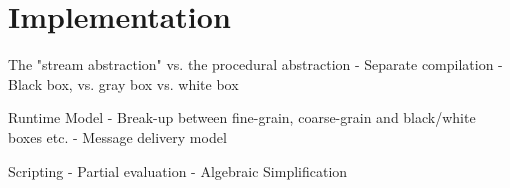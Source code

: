 \section{Implementation}

The "stream abstraction" vs. the procedural abstraction
-	Separate compilation
-	Black box, vs. gray box vs. white box

Runtime Model
-	Break-up between fine-grain, coarse-grain and black/white boxes etc.
-	Message delivery model

Scripting
-	Partial evaluation
-	Algebraic Simplification 


